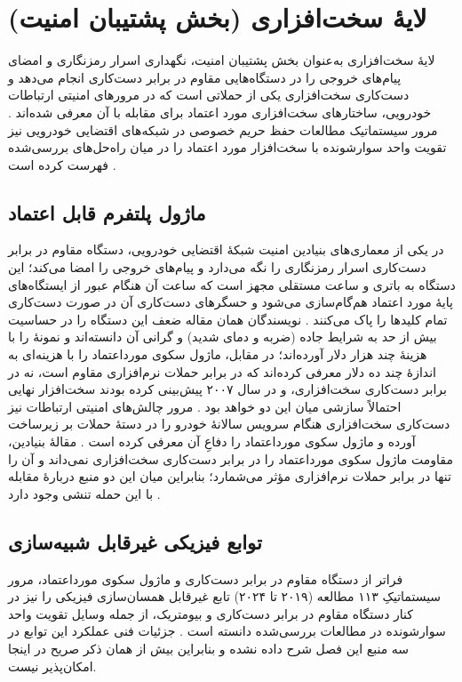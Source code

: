 \documentclass[12pt,a4paper]{article}
\begin{document}
\section{لایهٔ سخت‌افزاری (بخش پشتیبان امنیت)}
لایهٔ سخت‌افزاری به‌عنوان بخش پشتیبان امنیت، نگهداری اسرار رمزنگاری و امضای پیام‌های خروجی را در دستگاه‌هایی مقاوم در برابر دست‌کاری انجام می‌دهد و دست‌کاری سخت‌افزاری یکی از حملاتی است که در مرور‌های امنیتی ارتباطات خودرویی، ساختار‌های سخت‌افزاری مورد اعتماد برای مقابله با آن معرفی شده‌اند \cite{SecuringVehicularAd, farsimadanReviewSecurityChallenges2025}. مرور سیستماتیک مطالعات حفظ حریم خصوصی در شبکه‌های اقتضایی خودرویی نیز تقویت واحد سوارشونده با سخت‌افزار مورد اعتماد را در میان راه‌حل‌های بررسی‌شده فهرست کرده است \cite{rahmawatiagustinaSystematicLiteratureReview2025}.

\subsection{ماژول پلتفرم قابل اعتماد}
در یکی از معماری‌های بنیادین امنیت شبکهٔ اقتضایی خودرویی، دستگاه مقاوم در برابر دست‌کاری اسرار رمزنگاری را نگه می‌دارد و پیام‌های خروجی را امضا می‌کند؛ این دستگاه به باتری و ساعت مستقلی مجهز است که ساعت آن هنگام عبور از ایستگاه‌های پایهٔ مورد اعتماد هم‌گام‌سازی می‌شود و حسگر‌های دست‌کاری آن در صورت دست‌کاری تمام کلید‌ها را پاک می‌کنند \cite{SecuringVehicularAd}. نویسندگان همان مقاله ضعف این دستگاه را در حساسیت بیش از حد به شرایط جاده (ضربه و دمای شدید) و گرانی آن دانسته‌اند و نمونهٔ  را با هزینهٔ چند هزار دلار آورده‌اند؛ در مقابل، ماژول سکوی مورداعتماد را با هزینه‌ای به اندازهٔ چند ده دلار معرفی کرده‌اند که در برابر حملات نرم‌افزاری مقاوم است، نه در برابر دست‌کاری سخت‌افزاری، و در سال ۲۰۰۷ پیش‌بینی کرده بودند سخت‌افزار نهایی احتمالاً سازشی میان این دو خواهد بود \cite{SecuringVehicularAd}. مرور چالش‌های امنیتی ارتباطات  نیز دست‌کاری سخت‌افزاری هنگام سرویس سالانهٔ خودرو را در دستهٔ حملات بر زیرساخت آورده و ماژول سکوی مورداعتماد را دفاعِ آن معرفی کرده است \cite{farsimadanReviewSecurityChallenges2025}. مقالهٔ بنیادین، مقاومت ماژول سکوی مورداعتماد را در برابر دست‌کاری سخت‌افزاری نمی‌داند و آن را تنها در برابر حملات نرم‌افزاری مؤثر می‌شمارد؛ بنابراین میان این دو منبع دربارهٔ مقابله با این حمله تنشی وجود دارد \cite{SecuringVehicularAd}.

\subsection{توابع فیزیکی غیرقابل شبیه‌سازی}
فراتر از دستگاه مقاوم در برابر دست‌کاری و ماژول سکوی مورداعتماد، مرور سیستماتیکِ ۱۱۳ مطالعه (۲۰۱۹ تا ۲۰۲۴) تابع غیرقابل همسان‌سازی فیزیکی را نیز در کنار دستگاه مقاوم در برابر دست‌کاری و بیومتریک، از جمله وسایل تقویت واحد سوارشونده در مطالعات بررسی‌شده دانسته است \cite{rahmawatiagustinaSystematicLiteratureReview2025}. جزئیات فنی عملکرد این توابع در سه منبع این فصل شرح داده نشده و بنابراین بیش از همان ذکر صریح در اینجا امکان‌پذیر نیست.
\end{document}
